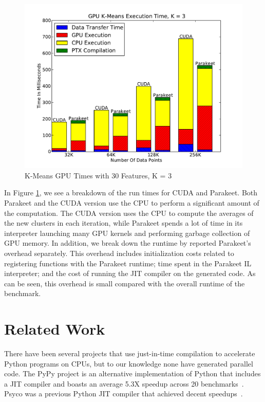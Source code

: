 \documentclass[10pt,twocolumn]{article}
\begin{document}
\begin{figure}
\includegraphics[scale=0.4]{KMGPU.pdf}
\caption{K-Means GPU Times with 30 Features, K = 3}
\label{KMGPU}
\end{figure}

In Figure \ref{KMGPU}, we see a breakdown of the run times for CUDA and Parakeet.  Both Parakeet and the CUDA version use the CPU to perform a significant amount of the computation.  The CUDA version uses the CPU to compute the averages of the new clusters in each iteration, while Parakeet spends a lot of time in its interpreter launching many GPU kernels and performing garbage collection of GPU memory.  In addition, we break down the runtime by reported Parakeet's overhead separately.  This overhead includes initialization costs related to registering functions with the Parakeet runtime; time spent in the Parakeet IL interpreter; and the cost of running the JIT compiler on the generated code.  As can be seen, this overhead is small compared with the overall runtime of the benchmark.

\section{Related Work}
\label{RelatedWork}
There have been several projects that use just-in-time compilation to accelerate Python programs on CPUs, but to our knowledge none have generated parallel code.  The PyPy project is an alternative implementation of Python that includes a JIT compiler and boasts an average 5.3X speedup across 20 benchmarks~\cite{Rigo06}. Psyco was a previous Python JIT compiler that achieved decent speedups~\cite{Rigo04}.
\end{document}
